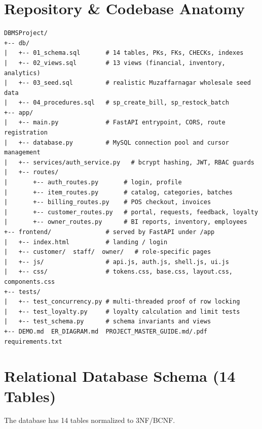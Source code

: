 \documentclass[10pt,a4paper]{article}
\newcommand{\code}[1]{\texttt{\detokenize{#1}}}
\begin{document}
\section{Repository \& Codebase Anatomy}
\begin{lstlisting}[basicstyle=\ttfamily\scriptsize]
DBMSProject/
+-- db/
|   +-- 01_schema.sql       # 14 tables, PKs, FKs, CHECKs, indexes
|   +-- 02_views.sql        # 13 views (financial, inventory, analytics)
|   +-- 03_seed.sql         # realistic Muzaffarnagar wholesale seed data
|   +-- 04_procedures.sql   # sp_create_bill, sp_restock_batch
+-- app/
|   +-- main.py             # FastAPI entrypoint, CORS, route registration
|   +-- database.py         # MySQL connection pool and cursor management
|   +-- services/auth_service.py   # bcrypt hashing, JWT, RBAC guards
|   +-- routes/
|       +-- auth_routes.py       # login, profile
|       +-- item_routes.py       # catalog, categories, batches
|       +-- billing_routes.py    # POS checkout, invoices
|       +-- customer_routes.py   # portal, requests, feedback, loyalty
|       +-- owner_routes.py      # BI reports, inventory, employees
+-- frontend/               # served by FastAPI under /app
|   +-- index.html          # landing / login
|   +-- customer/  staff/  owner/   # role-specific pages
|   +-- js/                 # api.js, auth.js, shell.js, ui.js
|   +-- css/                # tokens.css, base.css, layout.css, components.css
+-- tests/
|   +-- test_concurrency.py # multi-threaded proof of row locking
|   +-- test_loyalty.py     # loyalty calculation and limit tests
|   +-- test_schema.py      # schema invariants and views
+-- DEMO.md  ER_DIAGRAM.md  PROJECT_MASTER_GUIDE.md/.pdf  requirements.txt
\end{lstlisting}

\section{Relational Database Schema (14 Tables)}
The database \code{supermarket_db} has 14 tables normalized to 3NF/BCNF.
\end{document}

